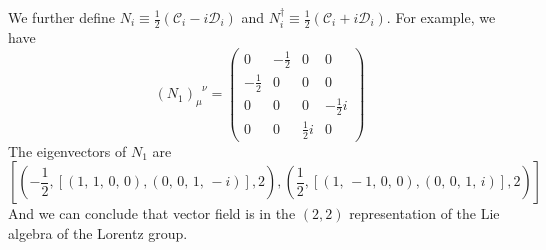 We further define $N_i \equiv \frac{1}{2}(\mathcal{C}_i-i\mathcal{D}_i)$ and $N^{\dagger}_i \equiv \frac{1}{2}(\mathcal{C}_i + i \mathcal{D}_i)$. For example, we have
\[(N_1)_{\mu}^{\phantom{\mu}\nu} = \left(\begin{array}{rrrr}
0 & -\frac{1}{2} & 0 & 0 \\
-\frac{1}{2} & 0 & 0 & 0 \\
0 & 0 & 0 & -\frac{1}{2} i \\
0 & 0 & \frac{1}{2} i & 0
\end{array}\right)\]
The eigenvectors of $N_1$ are
\[\left[\left(-\frac{1}{2}, \left[\left(1,\,1,\,0,\,0\right),
\left(0,\,0,\,1,\,-i\right)\right], 2\right), \left(\frac{1}{2},
\left[\left(1,\,-1,\,0,\,0\right), \left(0,\,0,\,1,\,i\right)\right],
2\right)\right]\]
And we can conclude that vector field is in the $(2,2)$ representation of the Lie algebra of the Lorentz group.

